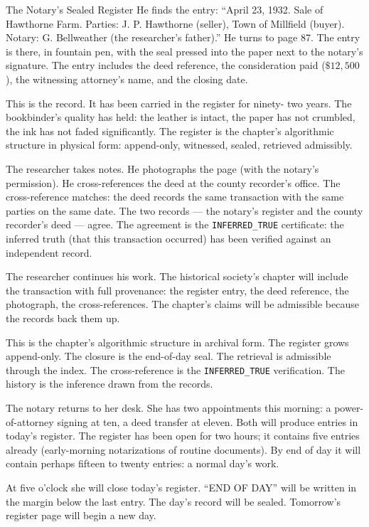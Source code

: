 \begin{coda}{The Notary's Sealed Register}
He finds the entry: ``April 23, 1932. Sale of Hawthorne Farm.
Parties: J. P. Hawthorne (seller), Town of Millfield (buyer). Notary:
G. Bellweather (the researcher's father).'' He turns to page 87. The
entry is there, in fountain pen, with the seal pressed into the
paper next to the notary's signature. The entry includes the deed
reference, the consideration paid ($\$12{,}500$), the witnessing
attorney's name, and the closing date.

This is the record. It has been carried in the register for ninety-
two years. The bookbinder's quality has held: the leather is
intact, the paper has not crumbled, the ink has not faded
significantly. The register is the chapter's algorithmic structure
in physical form: append-only, witnessed, sealed, retrieved
admissibly.

The researcher takes notes. He photographs the page (with the
notary's permission). He cross-references the deed at the county
recorder's office. The cross-reference matches: the deed records
the same transaction with the same parties on the same date. The
two records --- the notary's register and the county recorder's
deed --- agree. The agreement is the \texttt{INFERRED\_TRUE}
certificate: the inferred truth (that this transaction occurred)
has been verified against an independent record.

The researcher continues his work. The historical society's
chapter will include the transaction with full provenance: the
register entry, the deed reference, the photograph, the
cross-references. The chapter's claims will be admissible because
the records back them up.

This is the chapter's algorithmic structure in archival form. The
register grows append-only. The closure is the end-of-day seal.
The retrieval is admissible through the index. The cross-reference
is the \texttt{INFERRED\_TRUE} verification. The history is the
inference drawn from the records.

The notary returns to her desk. She has two appointments this
morning: a power-of-attorney signing at ten, a deed transfer at
eleven. Both will produce entries in today's register. The
register has been open for two hours; it contains five entries
already (early-morning notarizations of routine documents). By
end of day it will contain perhaps fifteen to twenty entries: a
normal day's work.

At five o'clock she will close today's register. ``END OF DAY''
will be written in the margin below the last entry. The day's
record will be sealed. Tomorrow's register page will begin a new
day.


\end{coda}
